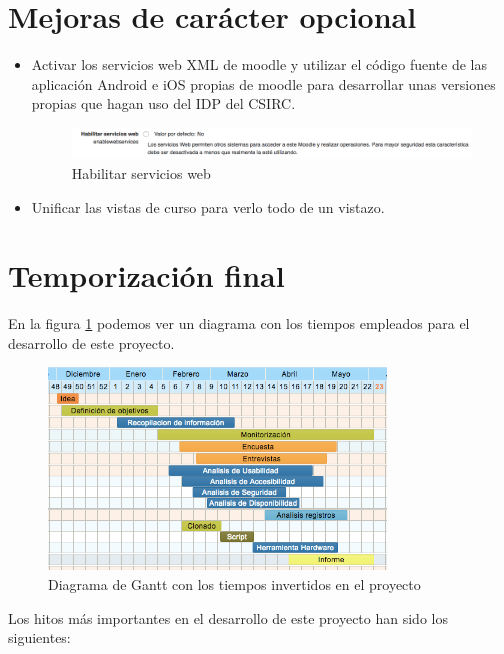 \section{Mejoras de carácter opcional}
\begin{itemize}
	\item Activar los servicios web XML de moodle y utilizar el código fuente de las aplicación Android e iOS propias de moodle para desarrollar unas versiones propias que hagan uso del IDP del CSIRC.
\begin{figure}[H]
\centering
\includegraphics[width=1.0\textwidth]{../screenshots/habilitar_serviciosweb}
\caption{Habilitar servicios web}
\end{figure}

	\item Unificar las vistas de curso para verlo todo de un vistazo.
	
\end{itemize}

\section{Temporización final}

En la figura \ref{fig:temporizacion2} podemos ver un diagrama con los tiempos empleados para el desarrollo de este proyecto. 

\begin{figure}[H]
\centering
\includegraphics[width=0.8\textwidth]{../screenshots/temporizacion2}
\caption{Diagrama de Gantt con los tiempos invertidos en el proyecto}
\label{fig:temporizacion2}
\end{figure}

Los hitos más importantes en el desarrollo de este proyecto han sido los siguientes:

